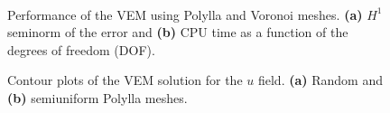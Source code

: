 \documentclass[lineno,pdflatex,sn-mathphys]{sn-jnl}%
\theoremstyle{thmstyleone}%
\theoremstyle{thmstyletwo}%
\theoremstyle{thmstylethree}%
\begin{document}
\begin{figure}[!bth]
\centering     %
\mbox{
 \hspace{0.1cm}
}
\caption{Performance of the VEM using Polylla and Voronoi meshes. \textbf{(a)} $H^1$ seminorm of the error and 
\textbf{(b)} CPU time as a function of the degrees of freedom (DOF).}
\label{figs:PerformanceLshaped} 
\end{figure}

\begin{figure}[!bth]
\centering     %
{} \hspace{0.5cm}
\caption{Contour plots of the VEM solution for the $u$ field. \textbf{(a)} Random and \textbf{(b)} semiuniform Polylla meshes.}
\label{figs:ContourPlots} 
\end{figure}
\end{document}
